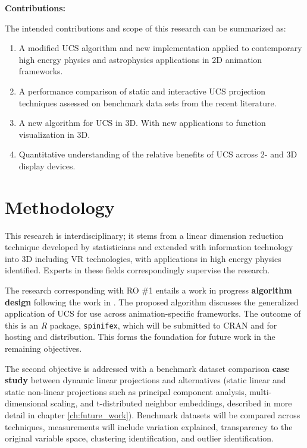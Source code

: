 \documentclass{monashthesis}
\begin{document}
\textbf{Contributions:}

The intended contributions and scope of this research can be summarized
as:

\begin{enumerate}
\def\labelenumi{\arabic{enumi}.}
\tightlist
\item
  A modified UCS algorithm and new implementation applied to
  contemporary high energy physics and astrophysics applications in 2D
  animation frameworks.
\item
  A performance comparison of static and interactive UCS projection
  techniques assessed on benchmark data sets from the recent literature.
\item
  A new algorithm for UCS in 3D. With new applications to function
  visualization in 3D.
\item
  Quantitative understanding of the relative benefits of UCS across 2-
  and 3D display devices.
\end{enumerate}

\section{Methodology}\label{methodology}

This research is interdisciplinary; it stems from a linear dimension
reduction technique developed by statisticians and extended with
information technology into 3D including VR technologies, with
applications in high energy physics
identified\autocite{cook_dynamical_2018}. Experts in these fields
correspondingly supervise the research.

The research corresponding with RO \#1 entails a work in progress
\textbf{algorithm design} following the work in
\textcite{cook_manual_1997}. The proposed algorithm discusses the
generalized application of UCS for use across animation-specific
frameworks. The outcome of this is an \emph{R} package,
\texttt{spinifex}, which will be submitted to CRAN and for hosting and
distribution. This forms the foundation for future work in the remaining
objectives.

The second objective is addressed with a benchmark dataset comparison
\textbf{case study} between dynamic linear projections and alternatives
(static linear and static non-linear projections such as principal
component analysis, multi-dimensional scaling, and t-distributed
neighbor embeddings, described in more detail in chapter
\ref{ch:future_work}). Benchmark datasets will be compared across
techniques, measurements will include variation explained, transparency
to the original variable space, clustering identification, and outlier
identification.
\end{document}
